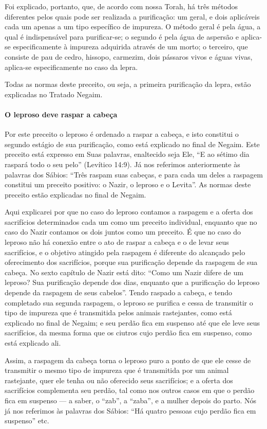 Foi explicado, portanto, que, de acordo com nossa Torah, há três
métodos diferentes pelos quais pode ser realizada a purificação: um
geral, e dois aplicáveis cada um apenas a um tipo específico de
impureza. O método geral é pela água, a qual é indispensável para
purificar-se; o segundo é pela água de aspersão e aplica-se
especificamente à impureza adquirida através de um morto; o terceiro,
que consiste de pau de cedro, hissopo, carmezim, dois pássaros vivos e
águas vivas, aplica-se especificamente no caso da lepra.

Todas as normas deste preceito, ou seja, a primeira purificação da
lepra, estão explicadas no Tratado Negaim.

\paragraph{O leproso deve raspar a cabeça}

Por este preceito o leproso é ordenado a raspar a cabeça, e isto
constitui o segundo estágio de sua purificação, como está explicado no
final de Negaim. Este preceito está expresso em Suas palavras,
enaltecido seja Ele, ``E ao sétimo dia raspará todo o seu pelo''
(Levítico 14:9). Já nos referimos anteriormente às palavras dos Sábios:
``Três raspam suas cabeças, e para cada um deles
a raspagem constitui um preceito positivo: o Nazir, o leproso e o
Levita''. As normas deste preceito estão explicadas no final de Negaim.

Aqui explicarei por que no caso do leproso contamos a raspagem e a
oferta dos sacrifícios determinados cada um como um preceito individual,
enquanto que no caso do Nazir contamos os dois juntos como um preceito.
É que no caso do leproso não há conexão entre o ato de raspar a cabeça e
o de levar seus sacrifícios, e o objetivo atingido pela raspagem é
diferente do alcançado pelo oferecimento dos sacrifícios, porque sua
purificação depende da raspagem de sua cabeça. No sexto capítulo de
Nazir está dito: ``Como um Nazir difere de um leproso? Sua purificação
depende dos dias, enquanto que a purificação do leproso depende da
raspagem de seus cabelos''. Tendo raspado a cabeça, e tendo completado
sua segunda raspagem, o leproso se purifica e cessa de transmitir o tipo
de impureza que é transmitida pelos animais rastejantes, como está
explicado no final de Negaim; e seu perdão fica em suspenso até que ele
leve seus sacrifícios, da mesma forma que os ciutros cujo perdão fica em
suspenso, como está explicado ali.

Assim, a raspagem da cabeça torna o leproso puro a ponto de que ele
cesse de transmitir o mesmo tipo de impureza que é transmitida por um
animal rastejante, quer ele tenha ou não oferecido seus sacrifícios; e a
oferta dos sacrifícios complementa seu perdão, tal como nos outros casos
em que o perdão fica em suspenso --- a saber, o ``zab'', a ``zaba'', e a
mulher depois do parto. Nós já nos referimos às palavras dos Sábios:
``Há quatro pessoas cujo perdão fica em suspenso'' etc.

